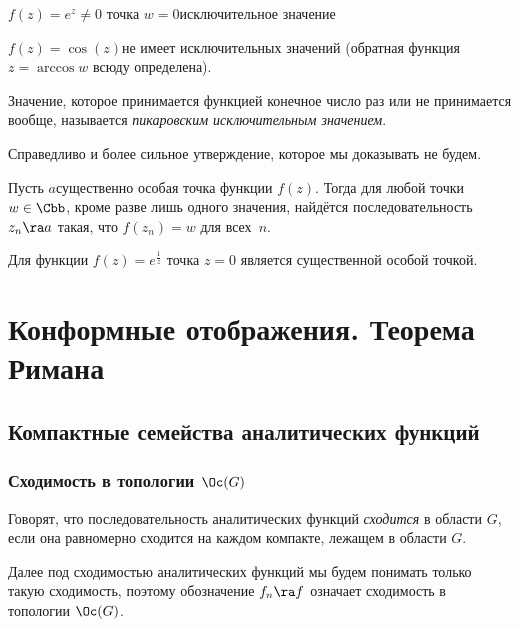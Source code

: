 \documentclass[a4paper]{article}
\begin{document}
\begin{theorem}
\begin{ex}
\begin{nums}{-2}
\item $f(z)=e^z \neq 0$ точка $w=0$\т исключительное значение
\item $f(z)=\cos (z)$\т не имеет исключительных значений  (обратная функция $z=\arccos w$ всюду определена).
\end{nums}
\end{ex}

\begin{df}
Значение, которое принимается функцией конечное число раз или не принимается вообще,
называется \emph{пикаровским исключительным значением}.
\end{df}

Справедливо и более сильное утверждение, которое мы доказывать не будем.
\begin{theorem}
Пусть $a$\т существенно особая точка функции $f(z)$. Тогда для любой точки $w\in \Cbb$,
кроме разве лишь одного значения, найдётся последовательность $z_n \ra a$ такая, что $f(z_n)=w$ для всех~$n$.
\end{theorem}

\begin{ex}
Для функции $f(z)= e^{\frac{1}{z}}$ точка $z=0$ является существенной особой точкой.
\end{ex}

\section{Конформные отображения. Теорема Римана}

\subsection{Компактные семейства аналитических функций}

\subsubsection{Сходимость в топологии $\Oc(G)$}

\begin{df}
Говорят, что последовательность аналитических функций \emph{сходится} в области $G$, если она равномерно сходится
на каждом компакте, лежащем в области $G$.
\end{df}


Далее под сходимостью аналитических функций мы будем понимать только такую сходимость, поэтому
обозначение $f_n\ra f$ означает сходимость в топологии $\Oc(G)$.


\end{theorem}
\end{document}
